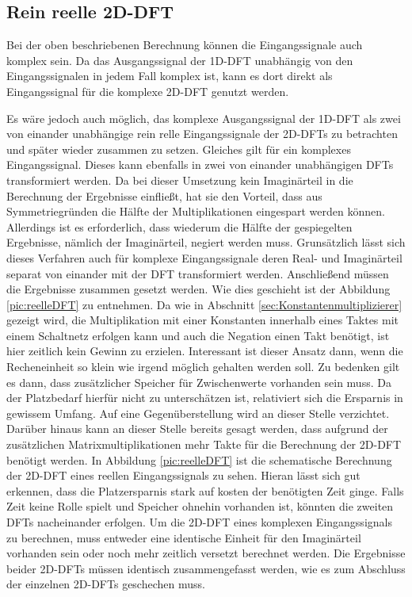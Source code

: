 \subsection{Rein reelle 2D-DFT}\label{sec:rein_reelle_dft}
Bei der oben beschriebenen Berechnung können die Eingangssignale auch komplex sein. Da das Ausgangssignal der 1D-DFT unabhängig von den Eingangssignalen in jedem Fall 
komplex ist, kann es dort direkt als Eingangssignal für die komplexe 2D-DFT genutzt werden. 

Es wäre jedoch auch möglich, das komplexe Ausgangssignal der 1D-DFT als zwei von einander unabhängige rein relle Eingangssignale der 2D-DFTs zu betrachten und später 
wieder zusammen zu setzen. Gleiches gilt für ein komplexes Eingangssignal. Dieses kann ebenfalls in zwei von einander unabhängigen DFTs transformiert werden.
Da bei dieser Umsetzung kein Imaginärteil in die Berechnung der Ergebnisse einfließt, hat sie den Vorteil, dass aus Symmetriegründen die Hälfte der Multiplikationen 
eingespart werden können. Allerdings ist es erforderlich, dass wiederum die Hälfte der gespiegelten Ergebnisse, nämlich der Imaginärteil, negiert werden muss. 
Grunsätzlich lässt sich dieses Verfahren auch für komplexe Eingangssignale deren Real- und Imaginärteil separat von einander mit der DFT transformiert werden.
Anschließend müssen die Ergebnisse zusammen gesetzt werden. Wie dies geschieht ist der Abbildung \ref{pic:reelleDFT} zu entnehmen.
Da wie in Abschnitt \ref{sec:Konstantenmultiplizierer} gezeigt wird, die Multiplikation
mit einer Konstanten innerhalb eines Taktes mit einem Schaltnetz erfolgen kann und auch die Negation einen Takt benötigt, ist hier zeitlich kein Gewinn zu erzielen.
Interessant ist dieser Ansatz dann, wenn die Recheneinheit so klein wie irgend möglich gehalten werden soll. Zu bedenken gilt es dann, dass zusätzlicher Speicher für 
Zwischenwerte vorhanden sein muss. Da der Platzbedarf hierfür nicht zu unterschätzen ist, relativiert sich die Ersparnis in gewissem Umfang. Auf eine Gegenüberstellung
wird an dieser Stelle verzichtet.
Darüber hinaus kann an dieser Stelle bereits gesagt werden, dass aufgrund der zusätzlichen Matrixmultiplikationen mehr Takte für die Berechnung der 2D-DFT benötigt werden.
In Abbildung \ref{pic:reelleDFT} ist die schematische Berechnung der 2D-DFT eines reellen Eingangssignals zu sehen. Hieran lässt sich gut erkennen, dass die Platzersparnis
stark auf kosten der benötigten Zeit ginge. Falls Zeit keine Rolle spielt und Speicher ohnehin vorhanden ist, könnten die zweiten DFTs nacheinander erfolgen.
Um die 2D-DFT eines komplexen Eingangssignals zu berechnen, muss entweder eine identische Einheit für den Imaginärteil vorhanden sein oder noch mehr zeitlich versetzt 
berechnet werden. Die Ergebnisse beider 2D-DFTs müssen identisch zusammengefasst werden, wie es zum Abschluss der einzelnen 2D-DFTs geschechen muss.

